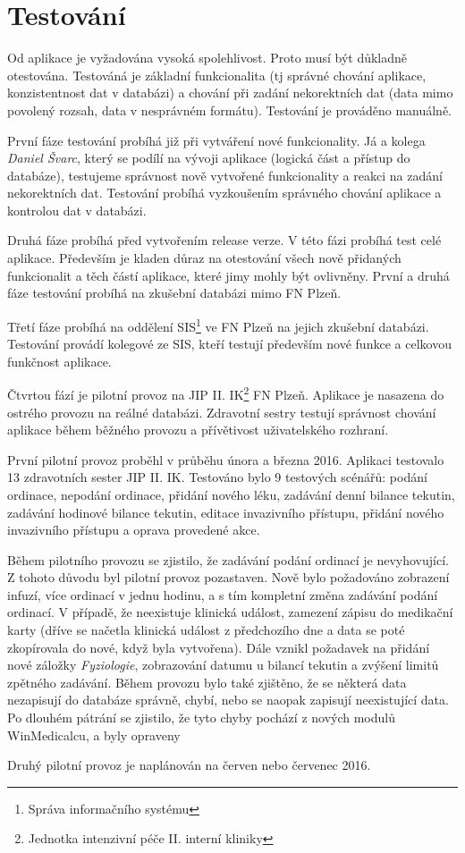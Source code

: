 \chapter{Testování}
\label{ch:test}

Od aplikace je vyžadována vysoká spolehlivost. Proto musí být důkladně otestována. Testováná je základní funkcionalita (tj správné chování aplikace, konzistentnost dat v databázi) a chování při zadání nekorektních dat (data mimo povolený rozsah, data v nesprávném formátu). Testování je prováděno manuálně.

První fáze testování probíhá již při vytváření nové funkcionality. Já a kolega \emph{Daniel Švarc}, který se podílí na vývoji aplikace (logická část a přístup do databáze), testujeme správnost nově vytvořené funkcionality a reakci na zadání nekorektních dat. Testování probíhá vyzkoušením správného chování aplikace a kontrolou dat v databázi.

Druhá fáze probíhá před vytvořením release verze. V této fázi probíhá test celé aplikace. Především je kladen důraz na otestování všech nově přidaných funkcionalit a těch částí aplikace, které jimy mohly být ovlivněny. První a druhá fáze testování probíhá na zkušební databázi mimo FN Plzeň.

Třetí fáze probíhá na oddělení SIS\footnote{Správa informačního systému} ve FN Plzeň na jejich zkušební databázi. Testování provádí kolegové ze SIS, kteří testují především nové funkce a celkovou funkčnost aplikace.

Čtvrtou fází je pilotní provoz na JIP II. IK\footnote{Jednotka intenzivní péče II. interní kliniky} FN Plzeň. Aplikace je nasazena do ostrého provozu na reálné databázi. Zdravotní sestry testují správnost chování aplikace během běžného provozu a přívětivost uživatelského rozhraní.

První pilotní provoz proběhl v průběhu února a března 2016. Aplikaci testovalo 13 zdravotních sester JIP II. IK. Testováno bylo 9 testových scénářů: podání ordinace, nepodání ordinace, přidání nového léku, zadávání denní bilance tekutin, zadávání hodinové bilance tekutin, editace invazivního přístupu, přidání nového invazivního přístupu a oprava provedené akce.

Během pilotního provozu se zjistilo, že zadávání podání ordinací je nevyhovující. Z tohoto důvodu byl pilotní provoz pozastaven. Nově bylo požadováno zobrazení infuzí, více ordinací v jednu hodinu, a s tím kompletní změna zadávání podání ordinací. V případě, že neexistuje klinická událost, zamezení zápisu do medikační karty (dříve se načetla klinická událost z předchozího dne a data se poté zkopírovala do nové, když byla vytvořena).  Dále vznikl požadavek na přidání nové záložky \emph{Fyziologie}, zobrazování datumu u bilancí tekutin a zvýšení limitů zpětného zadávání. Během provozu bylo také zjištěno, že se některá data nezapisují do databáze správně, chybí, nebo se naopak zapisují neexistující data. Po dlouhém pátrání se zjistilo, že tyto chyby pochází z nových modulů WinMedicalcu, a byly opraveny

Druhý pilotní provoz je naplánován na červen nebo červenec 2016.